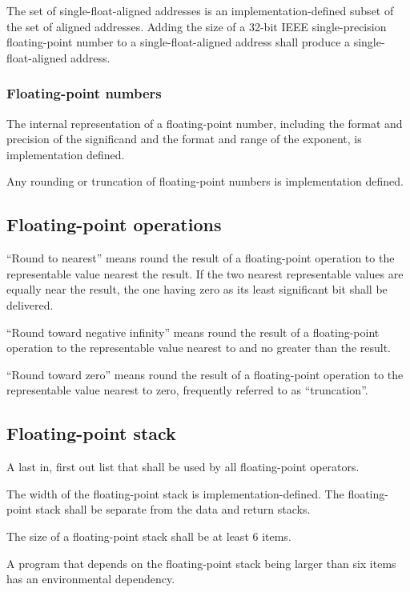 The set of single-float-aligned addresses is an implementation-defined
subset of the set of aligned addresses. Adding the size of a 32-bit
IEEE single-precision floating-point number to a single-float-aligned
address shall produce a single-float-aligned address.

\subsubsection{Floating-point numbers} %
\label{float:num}

The internal representation of a floating-point number, including the
format and precision of the significand and the format and range of
the exponent, is implementation defined.

Any rounding or truncation of floating-point numbers is implementation
defined.

\subsection{Floating-point operations} %
\label{float:ops}

``Round to nearest'' means round the result of a floating-point
operation to the representable value nearest the result. If the two
nearest representable values are equally near the result, the one
having zero as its least significant bit shall be delivered.

``Round toward negative infinity'' means round the result of a
floating-point operation to the representable value nearest to and
no greater than the result.

``Round toward zero'' means round the result of a floating-point
operation to the representable value nearest to zero, frequently
referred to as ``truncation''.

\subsection{Floating-point stack} %
\label{float:stack}

A last in, first out list that shall be used by all floating-point
operators.

The width of the floating-point stack is implementation-defined.
The floating-point stack shall be separate from the data and return
stacks.

The size of a floating-point stack shall be at least 6 items.

A program that depends on the floating-point stack being larger than
six items has an environmental dependency.

